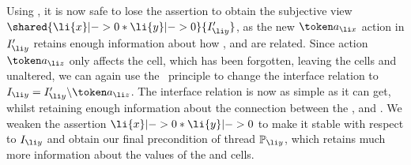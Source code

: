 Using \forgetRule,  it is now safe to lose the  assertion  to
obtain the subjective view  $\shared{\li{x}|-> 0 * \li{y}|->0 }{I'_{\li y}}$,  as 
the new $\token a_{\li x}$ action in $I'_{\li y}$ retains enough information about how
,  and  are related.
Since action $\token a_{\li z}$ only affects the  cell, which has been
forgotten, leaving  the cells  and  unaltered, we can again use the
\shiftRule\ principle to change  the interface
relation to $I_{\li y} = I'_{\li y} \backslash \token a_{\li z}$. The interface relation
is now as simple as it can get, whilst retaining enough information
about the 
connection between the ,  and . We weaken
the 
assertion $\li{x}|-> 0 * \li{y}|->0$ to make it stable with respect to $I_{\li y}$ and obtain our final
precondition of thread $\mathbb{P}_{\li y}$, which retains much more
information about the values of the  and  cells. 







